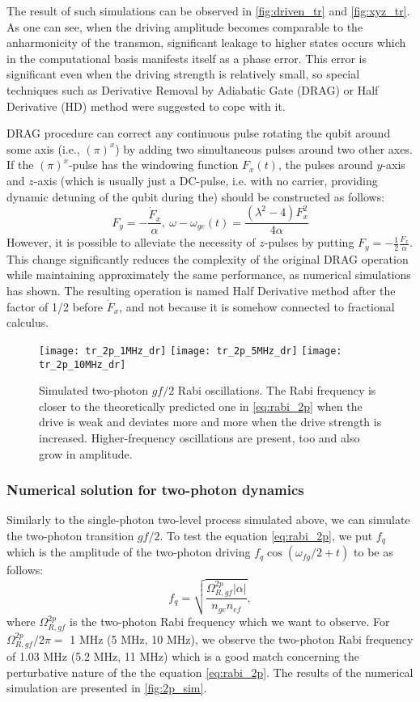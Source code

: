 \documentclass[12pt, twoside]{report}
\numberwithin{equation}{section}
\begin{document}
The result of such simulations can be observed in \autoref{fig:driven_tr} and \autoref{fig:xyz_tr}. As one can see, when the driving amplitude becomes comparable to the anharmonicity of the transmon, significant leakage to higher states occurs which in the computational basis manifests itself as a phase error. This error is significant even when the driving strength is relatively small, so special techniques such as Derivative Removal by Adiabatic Gate\cite{Motzoi2009,Chow2010} (DRAG) or Half Derivative\cite{Lucero2010} (HD) method were suggested to cope with it.

DRAG procedure can correct any continuous pulse rotating the qubit around some axis (i.e., $(\pi)^x$) by adding two simultaneous pulses around two other axes. If the  $(\pi)^x$-pulse has the windowing function $F_x(t)$, the pulses around $y$-axis and $z$-axis (which is usually just a DC-pulse, i.e. with no carrier, providing dynamic detuning of the qubit during the) should be constructed as follows:
\[
F_y = -\frac{\dot F_x}{\alpha},\ \omega-\omega_{ge}(t) = \frac{(\lambda^2-4)F_x^2}{4\alpha}
\]
However, it is possible to alleviate the necessity of $z$-pulses by putting $F_y=-\frac{1}{2}\frac{\dot F_x}{\alpha}$. This change significantly reduces the complexity of the original DRAG operation while maintaining approximately the same performance, as numerical simulations has shown\cite{Lucero2010}. The resulting operation is named Half Derivative method after the factor of 1/2 before $\dot F_x$, and not because it is somehow connected to fractional calculus.

\begin{figure}
\centering
\texttt{[image: tr\_2p\_1MHz\_dr]} \texttt{[image: tr\_2p\_5MHz\_dr]} \texttt{[image: tr\_2p\_10MHz\_dr]}
\caption{Simulated two-photon $gf/2$ Rabi oscillations. The Rabi frequency is closer to the theoretically predicted one in \eqref{eq:rabi_2p} when the drive is weak and deviates more and more when the drive strength is increased. Higher-frequency oscillations are present, too and also grow in amplitude.}
\label{fig:2p_sim}
\end{figure}

\subsubsection{Numerical solution for two-photon dynamics}

Similarly to the single-photon two-level process simulated above, we can simulate the two-photon transition $gf/2$. To test the equation \eqref{eq:rabi_2p}, we put $f_q$ which is the amplitude of the two-photon driving $f_q \cos(\omega_{fg}/2+t)$ to be as follows:
\[
f_q = \sqrt{\frac{\Omega_{R,gf}^{2p} |\alpha|}{n_{ge}n_{ef}}},
\]
where $\Omega_{R,gf}^{2p}$ is the two-photon Rabi frequency which we want to observe. For $\Omega_{R,gf}^{2p}/2\pi =$ 1 MHz (5 MHz, 10 MHz), we observe the two-photon Rabi frequency of 1.03 MHz (5.2 MHz, 11 MHz) which is a good match concerning the perturbative nature of the the equation \eqref{eq:rabi_2p}. The results of the numerical simulation are presented in \autoref{fig:2p_sim}.
\end{document}
